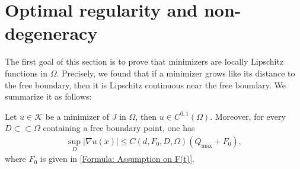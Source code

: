 \documentclass[11pt,reqno]{amsart}
\begin{document}
\section{Optimal regularity and non-degeneracy}
The first goal of this section is to prove that minimizers are locally Lipschitz functions in $\Omega$. Precisely, we found that if a minimizer grows like its distance to the free boundary, then it is Lipschitz continuous near the free boundary. We summarize it as follows:
\begin{proposition}\label{Proposition: Lipschitz regularity of minimizers}
	Let $u\in\mathcal{K}$ be a minimizer of $J$ in $\Omega$, then $u\in C^{0,1}(\Omega)$. Moreover, for every $D\subset\subset\Omega$ containing a free boundary point, one has
	\begin{align}\label{Formula: O(''(0))}
		\sup_{D}|\nabla u(x)|\leqslant C(d,F_{0},D,\Omega)(Q_{\mathrm{max}}+F_{0}),
	\end{align}
    where $F_{0}$ is given in \eqref{Formula: Assumption on F(t)}.
\end{proposition}
\end{document}

